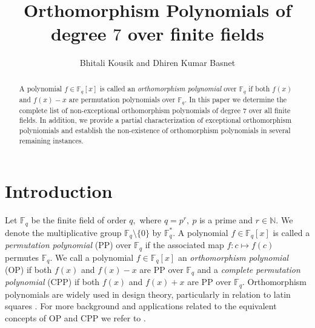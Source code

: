 \documentclass[12pt,a4wide, reqno]{amsart}
\theoremstyle{definition}
\theoremstyle{remark}
\numberwithin{equation}{section}
\begin{document}
\title{Orthomorphism Polynomials of degree $7$ over finite fields}
\author{ Bhitali Kousik and Dhiren Kumar Basnet  }
\address{department of mathematical sciences, tezpur univeristy, tezpur 784028, Assam, India}

\begin{abstract}
    A polynomial $f\in\mathbb{F}_q[x]$ is called an \textit{orthomorphism polynomial} over $\mathbb{F}_q$ if both $f(x)$ and $f(x)-x$ are permutation polynomials over $\mathbb{F}_q.$ In this paper we determine the complete list of non-exceptional orthomorphism polynomials of degree $7$ over all finite fields. In addition, we provide a partial characterization of exceptional orthomorphism polyniomials and establish the non-existence of orthomorphism polynomials in several remaining instances.
\end{abstract}
 
\maketitle
\section{Introduction} 
Let $\mathbb{F}_q$ be the finite field of order $q,$ where $q=p^r,~p$ is a prime and $r\in\mathbb{N}$. We denote the multiplicative group $\mathbb{F}_q\setminus\{0\}$ by $\mathbb{F}_q^*.$ A polynomial $f\in \mathbb{F}_q[x]$ is called a \textit{permutation polynomial} (PP) over $\mathbb{F}_q$ if the associated map $f:c \mapsto f(c)$ permutes $\mathbb{F}_q.$ We call a polynomial $f\in \mathbb{F}_q[x]$ an \textit{orthomorphism polynomial} (OP) if both $f(x)$ and $f(x)-x$ are PP over $\mathbb{F}_q$ and a \textit{complete permutation polynomial} (CPP) if both $f(x)$ and $f(x)+x$ are PP over $\mathbb{F}_q.$ Orthomorphism polynomials are widely used in design theory, particularly in relation to latin squares \cite{evans, wanless}. For more background and applications related to the equivalent concepts of OP and CPP we refer to \cite{ winterhof, wanless2, wanless3}. 
\end{document}
